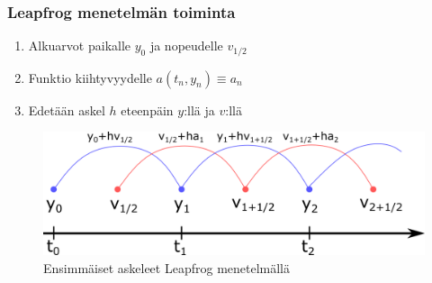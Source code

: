 \documentclass[finnish, 11pt, fleqn]{beamer}
\begin{document}
\begin{frame}
	\frametitle{Leapfrog menetelmän toiminta}
	\vspace{1em}
	\begin{enumerate}
		\item{Alkuarvot paikalle $y_0$ ja nopeudelle $v_{1/2}$}
		\vspace{0.5em}
		\item{Funktio kiihtyvyydelle $a(t_n, y_n)\equiv a_n$}
		\vspace{0.5em}
		\item{\small Edetään askel $h$ eteenpäin $y$:llä ja $v$:llä}
	\end{enumerate}
	\vspace{1em}
	\begin{figure}[h!]
		\includegraphics[scale=0.6]{graphics/leapfrog_ult.png}	
		{\caption{Ensimmäiset askeleet Leapfrog menetelmällä}}
	\end{figure}
\end{frame}
\end{document}
